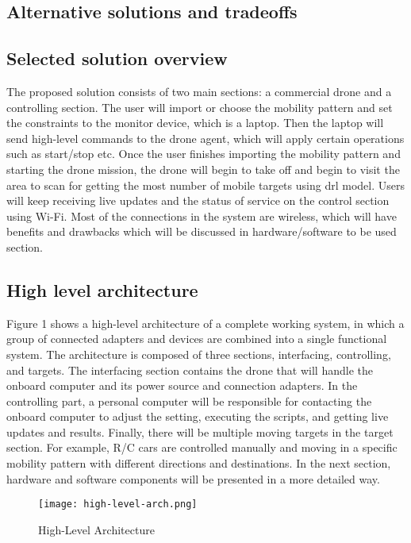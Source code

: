 \documentclass[../main.tex]{subfiles}
\begin{document}
\subsection{Alternative solutions and tradeoffs}

\subsection{Selected solution overview}
The proposed solution consists of two main sections: a commercial drone and a controlling section. The user will import or choose the mobility pattern and set the constraints to the monitor device, which is a laptop. Then the laptop will send high-level commands to the drone agent, which will apply certain operations such as start/stop etc. Once the user finishes importing the mobility pattern and starting the drone mission, the drone will begin to take off and begin to visit the area to scan for getting the most number of mobile targets using \gls{drl} model. Users will keep receiving live updates and the status of service on the control section using Wi-Fi. Most of the connections in the system are wireless, which will have benefits and drawbacks which will be discussed in hardware/software to be used section.


\subsection{High level architecture}
Figure 1 shows a high-level architecture of a complete working system, in which a group of connected adapters and devices are combined into a single functional system. The architecture is composed of three sections, interfacing, controlling, and targets. The interfacing section contains the drone that will handle the onboard computer and its power source and connection adapters. In the controlling part, a personal computer will be responsible for contacting the onboard computer to adjust the setting, executing the scripts, and getting live updates and results. Finally, there will be multiple moving targets in the target section. For example, R/C cars are controlled manually and moving in a specific mobility pattern with different directions and destinations. In the next section, hardware and software components will be presented in a more detailed way.

\begin{figure}[H]
	\centering
	\texttt{[image: high-level-arch.png]}
	\caption{High-Level Architecture}\label{fig1:arch-fig}
\end{figure}
\end{document}
